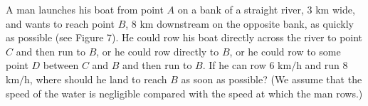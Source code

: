 \documentclass{sebase}
\begin{document}
\begin{Example}[4]
A man launches his boat
from point $A$ on a bank of a straight river, 3 km wide, and wants to reach
point $B$, 8 km downstream on the opposite bank, as quickly as possible (see
Figure 7). He could row his boat directly across the river to point $C$ and
then run to $B$, or he could row directly to $B$, or he could row to some
point $D$ between $C$ and $B$ and then run to $B$. If he can row 6 km$/$h
and run 8 km$/$h, where should he land to reach $B$ as soon as possible? (We
assume that the speed of the water is negligible compared with the speed at
which the man rows.)
\end{Example}
\end{document}
